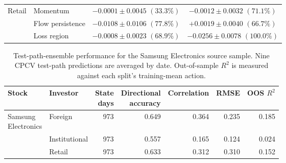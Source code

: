\begin{table}[t]
\begin{tabular}{@{}llcc@{}}
    Retail
      & Momentum         & \shortstack{$-0.0001 \pm 0.0045$\\$(33.3\%)$} & \shortstack{$-0.0012 \pm 0.0032$\\$(71.1\%)$} \\
      & Flow persistence & \shortstack{$-0.0108 \pm 0.0106$\\$(77.8\%)$} & \shortstack{$+0.0019 \pm 0.0040$\\$(66.7\%)$} \\
      & Loss region      & \shortstack{$-0.0008 \pm 0.0023$\\$(68.9\%)$} & \shortstack{$-0.0256 \pm 0.0078$\\$(100.0\%)$} \\
    \bottomrule
  \end{tabular}
\end{table}


\begin{table}[t]
  \caption{Test-path-ensemble performance for the Samsung Electronics
  source sample. Nine CPCV test-path predictions are averaged by date.
  Out-of-sample $R^2$ is measured against each split's training-mean
  action.}
  \label{tab:cross-stock-performance}
  \centering
  \scriptsize
  \setlength{\tabcolsep}{2pt}
  \begin{tabular}{@{}llrrrrr@{}}
    \toprule
    Stock & Investor & \shortstack{State\\days} & \shortstack{Directional\\accuracy} & Correlation & RMSE & OOS $R^2$ \\
    \midrule
    \shortstack[l]{Samsung\\Electronics} & Foreign       & 973 & 0.649 & 0.364 & 0.235 & \phantom{-}0.185 \\
                                          & Institutional & 973 & 0.557 & 0.165 & 0.124 & \phantom{-}0.024 \\ %
                                          & Retail        & 973 & 0.633 & 0.312 & 0.310 & \phantom{-}0.152 \\
    \bottomrule
  \end{tabular}
\end{table}


